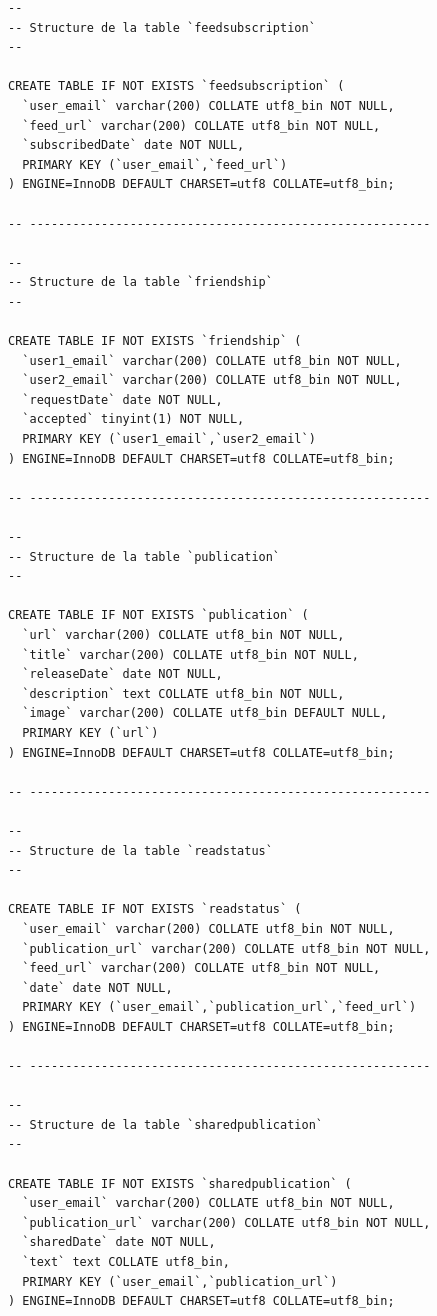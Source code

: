 \documentclass[a4paper,10pt]{article}
\begin{document}
\begin{lstlisting}
--
-- Structure de la table `feedsubscription`
--

CREATE TABLE IF NOT EXISTS `feedsubscription` (
  `user_email` varchar(200) COLLATE utf8_bin NOT NULL,
  `feed_url` varchar(200) COLLATE utf8_bin NOT NULL,
  `subscribedDate` date NOT NULL,
  PRIMARY KEY (`user_email`,`feed_url`)
) ENGINE=InnoDB DEFAULT CHARSET=utf8 COLLATE=utf8_bin;

-- --------------------------------------------------------

--
-- Structure de la table `friendship`
--

CREATE TABLE IF NOT EXISTS `friendship` (
  `user1_email` varchar(200) COLLATE utf8_bin NOT NULL,
  `user2_email` varchar(200) COLLATE utf8_bin NOT NULL,
  `requestDate` date NOT NULL,
  `accepted` tinyint(1) NOT NULL,
  PRIMARY KEY (`user1_email`,`user2_email`)
) ENGINE=InnoDB DEFAULT CHARSET=utf8 COLLATE=utf8_bin;

-- --------------------------------------------------------

--
-- Structure de la table `publication`
--

CREATE TABLE IF NOT EXISTS `publication` (
  `url` varchar(200) COLLATE utf8_bin NOT NULL,
  `title` varchar(200) COLLATE utf8_bin NOT NULL,
  `releaseDate` date NOT NULL,
  `description` text COLLATE utf8_bin NOT NULL,
  `image` varchar(200) COLLATE utf8_bin DEFAULT NULL,
  PRIMARY KEY (`url`)
) ENGINE=InnoDB DEFAULT CHARSET=utf8 COLLATE=utf8_bin;

-- --------------------------------------------------------

--
-- Structure de la table `readstatus`
--

CREATE TABLE IF NOT EXISTS `readstatus` (
  `user_email` varchar(200) COLLATE utf8_bin NOT NULL,
  `publication_url` varchar(200) COLLATE utf8_bin NOT NULL,
  `feed_url` varchar(200) COLLATE utf8_bin NOT NULL,
  `date` date NOT NULL,
  PRIMARY KEY (`user_email`,`publication_url`,`feed_url`)
) ENGINE=InnoDB DEFAULT CHARSET=utf8 COLLATE=utf8_bin;

-- --------------------------------------------------------

--
-- Structure de la table `sharedpublication`
--

CREATE TABLE IF NOT EXISTS `sharedpublication` (
  `user_email` varchar(200) COLLATE utf8_bin NOT NULL,
  `publication_url` varchar(200) COLLATE utf8_bin NOT NULL,
  `sharedDate` date NOT NULL,
  `text` text COLLATE utf8_bin,
  PRIMARY KEY (`user_email`,`publication_url`)
) ENGINE=InnoDB DEFAULT CHARSET=utf8 COLLATE=utf8_bin;


\end{lstlisting}
\end{document}

